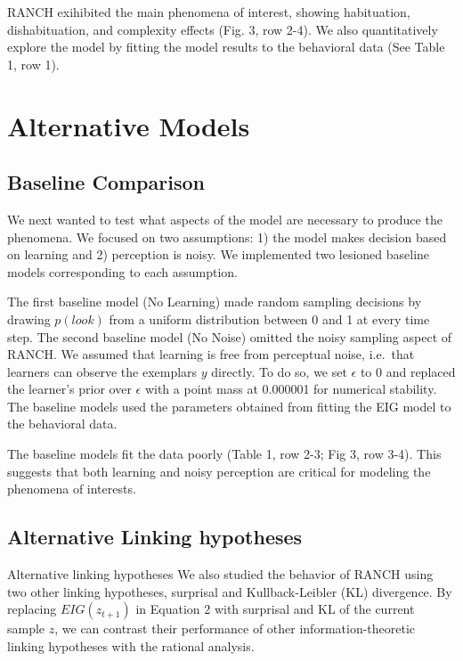 \documentclass[10pt, letterpaper]{article}
\begin{document}
RANCH exihibited the main phenomena of interest, showing habituation,
dishabituation, and complexity effects (Fig. 3, row 2-4). We also
quantitatively explore the model by fitting the model results to the
behavioral data (See Table 1, row 1).

\hypertarget{alternative-models}{%
\section{Alternative Models}\label{alternative-models}}

\hypertarget{baseline-comparison}{%
\subsection{Baseline Comparison}\label{baseline-comparison}}

We next wanted to test what aspects of the model are necessary to
produce the phenomena. We focused on two assumptions: 1) the model makes
decision based on learning and 2) perception is noisy. We implemented
two lesioned baseline models corresponding to each assumption.

The first baseline model (No Learning) made random sampling decisions by
drawing \(p(look)\) from a uniform distribution between 0 and 1 at every
time step. The second baseline model (No Noise) omitted the noisy
sampling aspect of RANCH. We assumed that learning is free from
perceptual noise, i.e.~that learners can observe the exemplars \(y\)
directly. To do so, we set \(\epsilon\) to 0 and replaced the learner's
prior over \(\epsilon\) with a point mass at 0.000001 for numerical
stability. The baseline models used the parameters obtained from fitting
the EIG model to the behavioral data.

The baseline models fit the data poorly (Table 1, row 2-3; Fig 3, row
3-4). This suggests that both learning and noisy perception are critical
for modeling the phenomena of interests.

\hypertarget{alternative-linking-hypotheses}{%
\subsection{Alternative Linking
hypotheses}\label{alternative-linking-hypotheses}}

Alternative linking hypotheses We also studied the behavior of RANCH
using two other linking hypotheses, surprisal and Kullback-Leibler (KL)
divergence. By replacing \(EIG(z_{t+1})\) in Equation 2 with surprisal
and KL of the current sample \(z\), we can contrast their performance of
other information-theoretic linking hypotheses with the rational
analysis.
\end{document}
